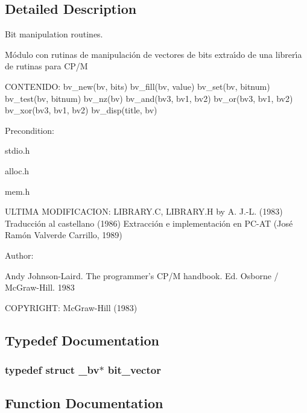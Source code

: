 \subsection{Detailed Description}
Bit manipulation routines.

 

 M\'{o}dulo con rutinas de manipulaci\'{o}n de vectores de bits extra\'{\i}do de una librer\'{\i}a de rutinas para CP/M

CONTENIDO: bv\_\-new(bv, bits) bv\_\-fill(bv, value) bv\_\-set(bv, bitnum) bv\_\-test(bv, bitnum) bv\_\-nz(bv) bv\_\-and(bv3, bv1, bv2) bv\_\-or(bv3, bv1, bv2) bv\_\-xor(bv3, bv1, bv2) bv\_\-disp(title, bv)

\begin{Desc}
\item[Precondition: ]\par
stdio.h \par
alloc.h \par
mem.h\end{Desc}
ULTIMA MODIFICACION: LIBRARY.C, LIBRARY.H by A. J.-L. (1983) Traducci\'{o}n al castellano (1986) Extracci\'{o}n e implementaci\'{o}n en PC-AT (Jos\'{e} Ram\'{o}n Valverde Carrillo, 1989)

\begin{Desc}
\item[Author: ]\par
Andy Johnson-Laird. The programmer's CP/M handbook. Ed. Osborne / Mc\-Graw-Hill. 1983\end{Desc}
COPYRIGHT: Mc\-Graw-Hill (1983)



\subsection{Typedef Documentation}
\subsubsection{\setlength{\rightskip}{0pt plus 5cm}typedef struct {\bf \_\-bv}$\ast$ bit\_\-vector}\label{P__bits_8c_a0}




\subsection{Function Documentation}
